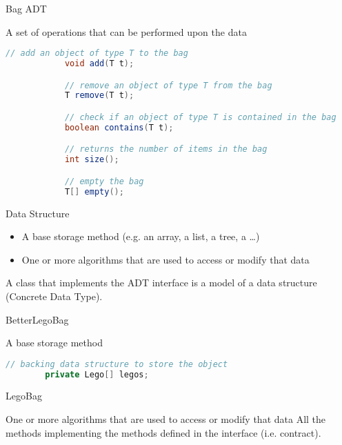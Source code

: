 \documentclass[pdf]{beamer}
\begin{document}
\begin{frame}[fragile]{Bag ADT}
    \begin{block}{A set of operations that can be performed upon the data}
        \begin{lstlisting}[language=Java,basicstyle=\ttfamily\tiny,keywordstyle=\color{blue}]
            // add an object of type T to the bag
            void add(T t);

            // remove an object of type T from the bag
            T remove(T t);

            // check if an object of type T is contained in the bag
            boolean contains(T t);

            // returns the number of items in the bag
            int size();

            // empty the bag
            T[] empty();
        \end{lstlisting}
    \end{block}
\end{frame}

\begin{frame}{Data Structure}
    \begin{itemize}
        \item A base storage method (e.g. an array, a list, a tree, a …)
        \item One or more algorithms that are used to access or modify that data
    \end{itemize}

    A class that implements the ADT interface is a model of a data structure (Concrete Data Type).
\end{frame}

\begin{frame}[fragile]{BetterLegoBag}
    \begin{block}{A base storage method}
        \begin{lstlisting}[language=Java,basicstyle=\ttfamily\scriptsize,keywordstyle=\color{blue}]
        // backing data structure to store the object
        private Lego[] legos;
        \end{lstlisting}
    \end{block}
\end{frame}

\begin{frame}{LegoBag}
    \begin{block}{One or more algorithms that are used to access or modify that data}
            All the methods implementing the methods defined in the interface (i.e. contract).
    \end{block}
\end{frame}
\end{document}
